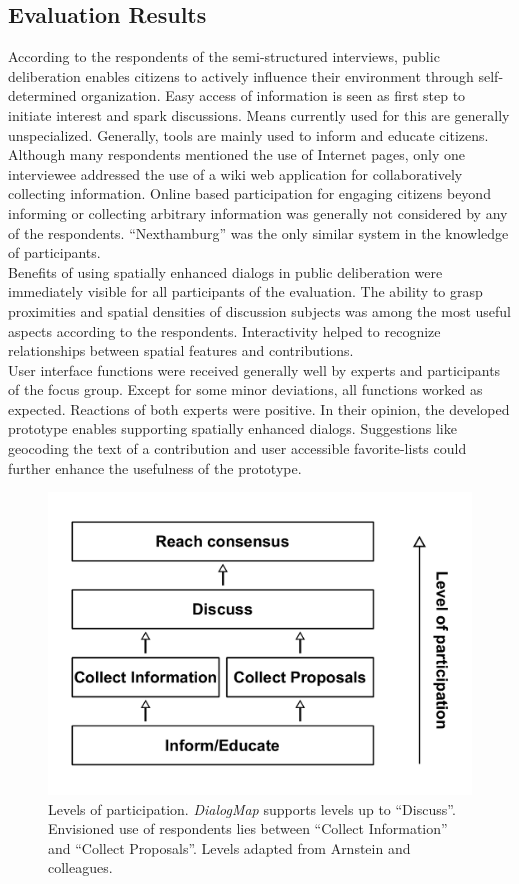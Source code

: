 \subsection{Evaluation Results}
\label{sub:evaluation-results}
According to the respondents of the semi-structured interviews, public deliberation enables citizens to actively influence their environment through self-determined organization. Easy access of information is seen as first step to initiate interest and spark discussions. Means currently used for this are generally unspecialized. Generally, tools are mainly used to inform and educate citizens. Although many respondents mentioned the use of Internet pages, only one interviewee addressed the use of a wiki web application for collaboratively collecting information. Online based participation for engaging citizens beyond informing or collecting arbitrary information was generally not considered by any of the respondents. ``Nexthamburg'' was the only similar system in the knowledge of participants.\\
Benefits of using spatially enhanced dialogs in public deliberation were immediately visible for all participants of the evaluation. The ability to grasp proximities and spatial densities of discussion subjects was among the most useful aspects according to the respondents. Interactivity helped to recognize relationships between spatial features and contributions.\\
User interface functions were received generally well by experts and participants of the focus group. Except for some minor deviations, all functions worked as expected. Reactions of both experts were positive. In their opinion, the developed prototype enables supporting spatially enhanced dialogs. Suggestions like geocoding the text of a contribution and user accessible favorite-lists could further enhance the usefulness of the prototype.\\%
\begin{figure}[!h]
    \centering
    \includegraphics[width=1\columnwidth]{images/my_ladder}
    \caption{Levels of participation. \textit{DialogMap} supports levels up to ``Discuss''. Envisioned use of respondents lies between ``Collect Information'' and ``Collect Proposals''. Levels adapted from Arnstein and colleagues.}
    \label{fig:my_ladder}
\end{figure}

